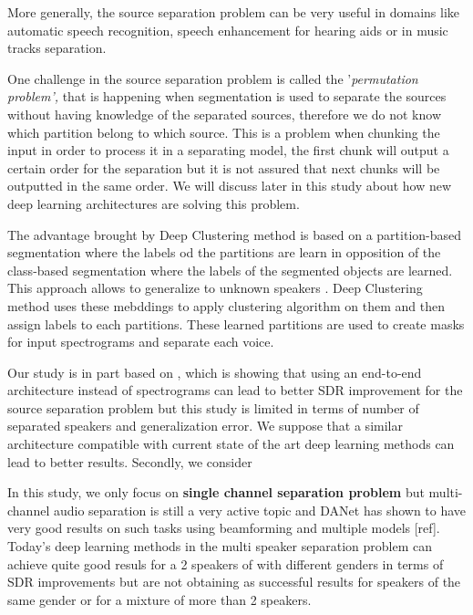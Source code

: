 \documentclass[master,final,11pt]{iscs-thesis}
\begin{document}
More generally, the source separation problem can be very useful in domains like automatic speech recognition, speech enhancement for hearing aids or  
in music tracks separation.


One challenge in the source separation problem is called the '\textit{permutation problem',} that is happening when segmentation is used to separate the sources without having knowledge of the separated sources, therefore we do not know which partition belong to which source. This is a problem when chunking the input in order to process it in a separating model, the first chunk will output a certain order for the separation but it is not assured that next chunks will be outputted in the same order. We will discuss later in this study about how new deep learning architectures are solving this problem.

The advantage brought by Deep Clustering method is based on a partition-based segmentation where the labels od the partitions are learn in opposition of the class-based segmentation where the labels of the segmented objects are learned. This approach allows to generalize to unknown speakers . Deep Clustering method uses these mebddings to apply clustering algorithm on them and then assign labels to each partitions. These learned partitions are used to create masks for input spectrograms and separate each voice.

Our study is in part based on \cite{Adaptive}, which is showing that using an end-to-end architecture instead of spectrograms can lead to better SDR improvement for the source separation problem but this study is limited in terms of number of separated speakers and generalization error. We suppose that a similar architecture compatible with current state of the art deep learning methods can lead to better results. Secondly, we consider

In this study, we only focus on \textbf{single channel separation problem} but multi-channel audio separation is still a very active topic and DANet has shown to have very good results on such tasks using beamforming and multiple models [ref]. Today's deep learning methods in the multi speaker separation problem  can achieve quite good resuls for a 2 speakers of with different genders in terms of SDR improvements but are not obtaining as successful results for speakers of the same gender or for a mixture of more than 2 speakers.
\end{document}
